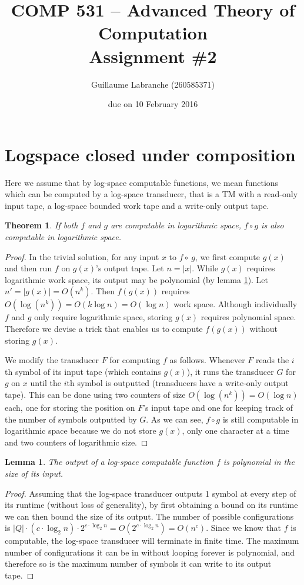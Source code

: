 \documentclass{article}
\author{Guillaume Labranche (260585371)}
\title{COMP 531 -- Advanced Theory of Computation\\Assignment \#2}
\date{due on 10 February 2016}
\newtheorem{theorem}{Theorem}
\newtheorem{lemma}{Lemma}
\begin{document}
\maketitle

\section{Logspace closed under composition}

Here we assume that by log-space computable functions, we mean functions which can be computed by a log-space transducer, that is a TM with a read-only input tape, a log-space bounded work tape and a write-only output tape.

\begin{theorem}If both $f$ and $g$ are computable in logarithmic space, $f \circ g$ is also computable in logarithmic space.
\end{theorem}
\begin{proof} In the trivial solution, for any input $x$ to $f \circ\ g$, we first compute $g(x)$ and then run $f$ on $g(x)$'s output tape. Let $n=|x|$. While $g(x)$ requires logarithmic work space, its output may be polynomial (by lemma \ref{lemma_logspace_polynomial}). Let $n' = |g(x)| = O(n^k)$. Then $f(g(x))$ requires $O(\log(n^k)) = O(k \log n) = O(\log n)$ work space. Although individually $f$ and $g$ only require logarithmic space, storing $g(x)$ requires polynomial space. Therefore we devise a trick that enables us to compute $f(g(x))$ without storing $g(x)$.

We modify the transducer $F$ for computing $f$ as follows. Whenever $F$ reads the $i$th symbol of its input tape (which contains $g(x)$), it runs the transducer $G$ for $g$ on $x$ until the $i$th symbol is outputted (transducers have a write-only output tape). This can be done using two counters of size $O(\log(n^k))=O(\log n)$ each, one for storing the position on $F$'s input tape and one for keeping track of the number of symbols outputted by $G$. As we can see, $f \circ g$ is still computable in logarithmic space because we do not store $g(x)$, only one character at a time and two counters of logarithmic size.
\end{proof}

\begin{lemma}\label{lemma_logspace_polynomial}
The output of a log-space computable function $f$ is polynomial in the size of its input.
\end{lemma}
\begin{proof}
Assuming that the log-space transducer outputs 1 symbol at every step of its runtime (without loss of generality), by first obtaining a bound on its runtime we can then bound the size of its output. The number of possible configurations is $|Q| \cdot (c \cdot \log_2 n) \cdot 2^{c \cdot \log_2 n} = O(2^{c \cdot \log_2 n}) = O(n^c)$. Since we know that $f$ is computable, the log-space transducer will terminate in finite time. The maximum number of configurations it can be in without looping forever is polynomial, and therefore so is the maximum number of symbols it can write to its output tape.
\end{proof}
\end{document}
